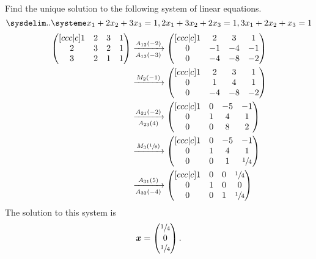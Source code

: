 \begin{example}
    Find the unique solution to the following system of linear equations.
    \[
        \linsys{
            x_1+2x_2+3x_3=1,
            2x_1+3x_2+2x_3=1,
            3x_1+2x_2+x_3=1
        }
    \]
    \begin{align*}
        \begin{pmatrix}[ccc|c]
            1&2&3&1\\
            2&3&2&1\\
            3&2&1&1\\
        \end{pmatrix}
        &\eroarrow{A_{12}(-2)}{A_{13}(-3)}
        \begin{pmatrix}[ccc|c]
            1&2&3&1\\
            0&-1&-4&-1\\
            0&-4&-8&-2\\
        \end{pmatrix}
        \\
        &\eroarrow{M_2(-1)}{}
        \begin{pmatrix}[ccc|c]
            1&2&3&1\\
            0&1&4&1\\
            0&-4&-8&-2\\
        \end{pmatrix}
        \\
        &\eroarrow{A_{21}(-2)}{A_{23}(4)}
        \begin{pmatrix}[ccc|c]
            1&0&-5&-1\\
            0&1&4&1\\
            0&0&8&2\\
        \end{pmatrix}
        \\
        &\eroarrow{M_{3}(\sfrac18)}{}
        \begin{pmatrix}[ccc|c]
            1&0&-5&-1\\
            0&1&4&1\\
            0&0&1&\sfrac14\\
        \end{pmatrix}
        \\
        &\eroarrow{A_{31}(5)}{A_{32}(-4)}
        \begin{pmatrix}[ccc|c]
            1&0&0&\sfrac14\\
            0&1&0&0\\
            0&0&1&\sfrac14\\
        \end{pmatrix}
    \end{align*}
    The solution to this system is 
    \[
        \bm x=
        \begin{pmatrix}
            \sfrac14\\0\\\sfrac14
        \end{pmatrix}
        .
    \]
\end{example}

